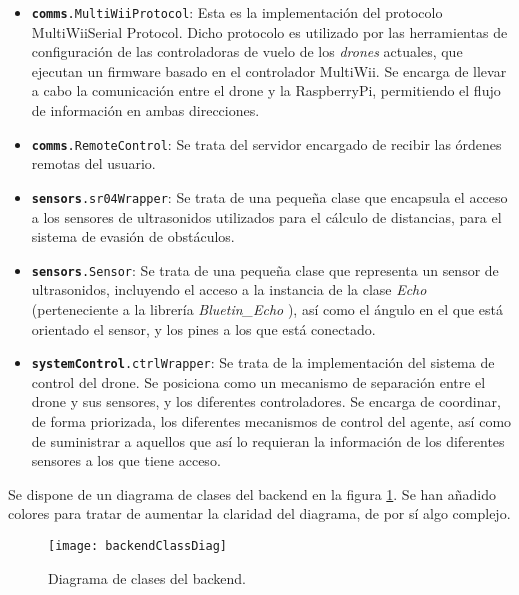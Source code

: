 \begin{itemize}
\item \texttt{\textbf{comms}.MultiWiiProtocol}: Esta es la implementación del protocolo MultiWiiSerial Protocol. Dicho protocolo es utilizado por las herramientas de configuración de las controladoras de vuelo de los \emph{drones} actuales, que ejecutan un firmware basado en el controlador MultiWii. Se encarga de llevar a cabo la comunicación entre el drone y la RaspberryPi, permitiendo el flujo de información en ambas direcciones. 
\item \texttt{\textbf{comms}.RemoteControl}: Se trata del servidor encargado de recibir las órdenes remotas del usuario.
\item \texttt{\textbf{sensors}.sr04Wrapper}: Se trata de una pequeña clase que encapsula el acceso a los sensores de ultrasonidos utilizados para el cálculo de distancias, para el sistema de evasión de obstáculos.
\item \texttt{\textbf{sensors}.Sensor}: Se trata de una pequeña clase que representa un sensor de ultrasonidos, incluyendo el acceso a la instancia de la clase \emph{Echo} (perteneciente a la librería \emph{Bluetin\_Echo} ), así como el ángulo en el que está orientado el sensor, y los pines a los que está conectado.
\item \texttt{\textbf{systemControl}.ctrlWrapper}: Se trata de la implementación del sistema de control del drone. Se posiciona como un mecanismo de separación entre el drone y sus sensores, y los diferentes controladores. Se encarga de coordinar, de forma priorizada, los diferentes mecanismos de control del agente, así como de suministrar a aquellos que así lo requieran la información de los diferentes sensores a los que tiene acceso.
\end{itemize}

Se dispone de un diagrama de clases del backend en la figura \ref{fig:backendClassDiag}. Se han añadido colores para tratar de aumentar la claridad del diagrama, de por sí algo complejo.
\newpage



\begin{figure}[H]
	\centering
	\texttt{[image: backendClassDiag]}
	\caption[Diagrama de clases BackEnd]{Diagrama de clases del backend.}\label{fig:backendClassDiag}
\end{figure}





















